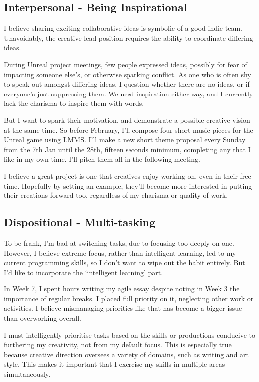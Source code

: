 \documentclass{scrartcl}
\begin{document}
\subsection{Interpersonal - Being Inspirational} %

I believe sharing exciting collaborative ideas is symbolic of a good indie team. Unavoidably, the creative lead position requires the ability to coordinate differing ideas.

During Unreal project meetings, few people expressed ideas, possibly for fear of impacting someone else's, or otherwise sparking conflict. As one who is often shy to speak out amongst differing ideas, I question whether there are no ideas, or if everyone's just suppressing them. We need inspiration either way, and I currently lack the charisma to inspire them with words.

But I want to spark their motivation, and demonstrate a possible creative vision at the same time. So before February, I'll compose four short music pieces for the Unreal game using LMMS. I'll make a new short theme proposal every Sunday from the 7th Jan until the 28th, fifteen seconds minimum, completing any that I like in my own time. I'll pitch them all in the following meeting.

I believe a great project is one that creatives enjoy working on, even in their free time. Hopefully by setting an example, they'll become more interested in putting their creations forward too, regardless of my charisma or quality of work.

\subsection{Dispositional - Multi-tasking} %

To be frank, I'm bad at switching tasks, due to focusing too deeply on one. However, I believe extreme focus, rather than intelligent learning, led to my current programming skills, so I don't want to wipe out the habit entirely. But I'd like to incorporate the `intelligent learning' part.

In Week 7, I spent hours writing my agile essay despite noting in Week 3 the importance of regular breaks. I placed full priority on it, neglecting other work or activities. I believe mismanaging priorities like that has become a bigger issue than overworking overall.

I must intelligently prioritise tasks based on the skills or productions conducive to furthering my creativity, not from my default focus. This is especially true because creative direction oversees a variety of domains, such as writing and art style. This makes it important that I exercise my skills in multiple areas simultaneously.
\end{document}

